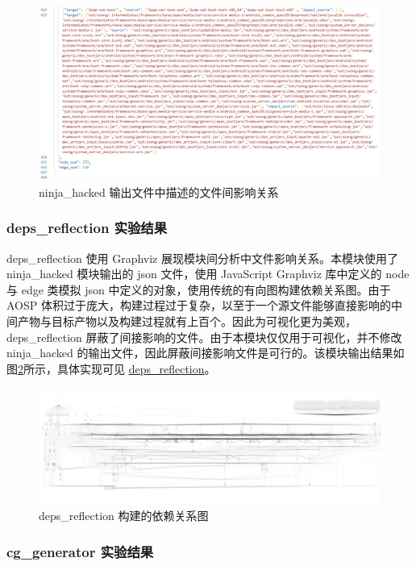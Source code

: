 \begin{figure}
    \centering
    \includegraphics[width=.8\textwidth]{figures/design-edge.png}
    \caption{ninja\_hacked 输出文件中描述的文件间影响关系}
    \label{fig:design-edge}
\end{figure}

\subsubsection{deps\_reflection 实验结果}

deps\_reflection 使用 Graphviz 展现模块间分析中文件影响关系。本模块使用了 ninja\_hacked 模块输出的 json 文件，使用 JavaScript Graphviz 库中定义的 node 与 edge 类模拟 json 中定义的对象，使用传统的有向图构建依赖关系图。由于 AOSP 体积过于庞大，构建过程过于复杂，以至于一个源文件能够直接影响的中间产物与目标产物以及构建过程就有上百个。因此为可视化更为美观，deps\_reflection 屏蔽了间接影响的文件。由于本模块仅仅用于可视化，并不修改 ninja\_hacked 的输出文件，因此屏蔽间接影响文件是可行的。该模块输出结果如图\ref{fig:design-deps-reflection}所示，具体实现可见 \href{https://github.com/AOSPworking/deps_reflection}{deps\_reflection}。

\begin{figure}
    \centering
    \includegraphics[width=.8\textwidth]{figures/design-view.png}
    \caption{deps\_reflection 构建的依赖关系图}
    \label{fig:design-deps-reflection}
\end{figure}

\subsubsection{cg\_generator 实验结果}

